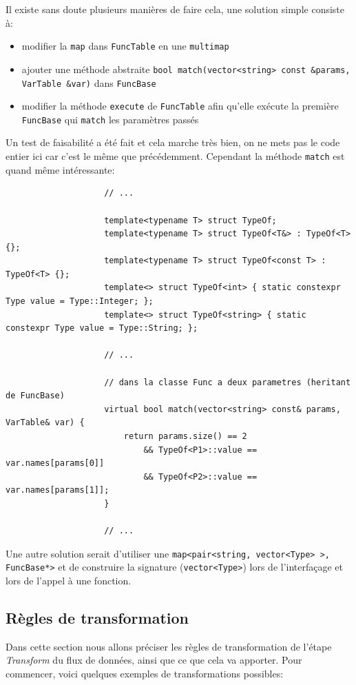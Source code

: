 \documentclass[french]{article}
\begin{document}
		Il existe sans doute plusieurs manières de faire cela, une solution simple consiste à: 
		
		\begin{itemize}
			\item modifier la \texttt{map} dans \texttt{FuncTable} en une \texttt{multimap}
			\item ajouter une méthode abstraite \texttt{bool match(vector<string> const \&params, VarTable \&var)} dans \texttt{FuncBase}
			\item modifier la méthode \texttt{execute} de \texttt{FuncTable} afin qu'elle exécute la première \texttt{FuncBase} qui \texttt{match} les paramètres passés
		\end{itemize}
		
		Un test de faisabilité a été fait et cela marche très bien, on ne mets pas le code entier ici car c'est le même que précédemment. Cependant la méthode \texttt{match} est quand même intéressante:
		
		\begin{lstlisting}
					// ...
					
					template<typename T> struct TypeOf;
					template<typename T> struct TypeOf<T&> : TypeOf<T> {};
					template<typename T> struct TypeOf<const T> : TypeOf<T> {};
					template<> struct TypeOf<int> { static constexpr Type value = Type::Integer; };
					template<> struct TypeOf<string> { static constexpr Type value = Type::String; };
					
					// ...
					
					// dans la classe Func a deux parametres (heritant de FuncBase)
					virtual bool match(vector<string> const& params, VarTable& var) {
						return params.size() == 2
							&& TypeOf<P1>::value == var.names[params[0]]
							&& TypeOf<P2>::value == var.names[params[1]];
					}
					
					// ...
		\end{lstlisting}
		
		Une autre solution serait d'utiliser une \texttt{map<pair<string, vector<Type> >, FuncBase*>} et de construire la signature (\texttt{vector<Type>}) lors de l'interfaçage et lors de l'appel à une fonction.
		
		\subsection{Règles de transformation}
		\label{subsec:regles-de-transformation}
		Dans cette section nous allons préciser les règles de transformation de l'étape \textit{Transform} du flux de données, ainsi que ce que cela va apporter. Pour commencer, voici quelques exemples de transformations possibles:
		
\end{document}
